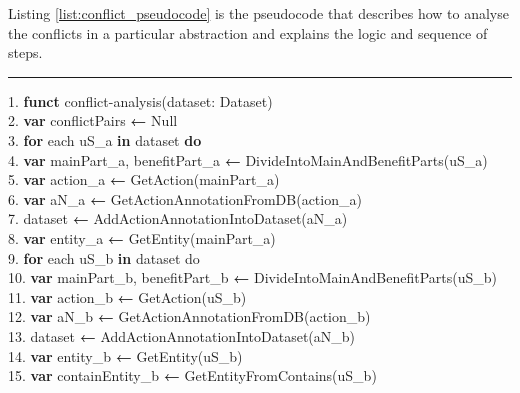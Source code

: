Listing \ref{list:conflict_pseudocode} is the pseudocode that describes how to analyse the conflicts in a particular abstraction and explains the logic and sequence of steps.
\newpage
\begin{MyListing}
	\scriptsize
	\hrule
	\begin{flushleft}
	 1. \textbf{funct} conflict-analysis(dataset: Dataset)\\
	 2. \hspace{12pt}\textbf{var} conflictPairs \textbf{←} Null\\
	 3. \hspace{12pt}\textbf{for} each uS\_a \textbf{in} dataset \textbf{do}	\\
	 4. \hspace{20pt}\textbf{var} mainPart\_a, benefitPart\_a \textbf{←} DivideIntoMainAndBenefitParts(uS\_a)\\
	 5. \hspace{20pt}\textbf{var} action\_a \textbf{←} GetAction(mainPart\_a)\\ 
	 6. \hspace{20pt}\textbf{var} aN\_a \textbf{←} GetActionAnnotationFromDB(action\_a)\\
	 7. \hspace{20pt}dataset  \textbf{←} AddActionAnnotationIntoDataset(aN\_a)\\
	 8. \hspace{20pt}\textbf{var} entity\_a \textbf{←} GetEntity(mainPart\_a)\\
	 9. \hspace{20pt}\textbf{for} each uS\_b \textbf{in} dataset do\\
	 10. \hspace{26pt}\textbf{var} mainPart\_b, benefitPart\_b \textbf{←}  DivideIntoMainAndBenefitParts(uS\_b)\\
	 11. \hspace{26pt}\textbf{var} action\_b \textbf{←} GetAction(uS\_b)\\ 
	 12. \hspace{26pt}\textbf{var} aN\_b \textbf{←} GetActionAnnotationFromDB(action\_b)\\
	 13. \hspace{26pt}dataset  \textbf{←} AddActionAnnotationIntoDataset(aN\_b)\\
	 14. \hspace{26pt}\textbf{var} entity\_b \textbf{←} GetEntity(uS\_b)\\
	 15. \hspace{26pt}\textbf{var} containEntity\_b \textbf{←}  GetEntityFromContains(uS\_b)\\

\end{flushleft}
\end{MyListing}
